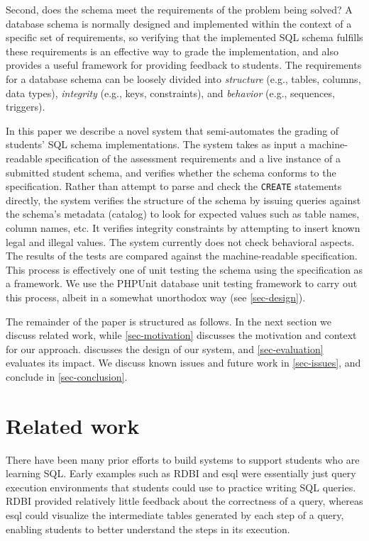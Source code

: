 \documentclass[sigconf, authordraft, capitalise]{acmart}
\begin{document}
Second, does the schema meet the requirements of the problem being solved? A database schema is normally designed and implemented within the context of a specific set of requirements, so verifying that the implemented SQL schema fulfills these requirements is an effective way to grade the implementation, and also provides a useful framework for providing feedback to students. The requirements for a database schema can be loosely divided into \emph{structure} (e.g., tables, columns, data types), \emph{integrity} (e.g., keys, constraints), and \emph{behavior} (e.g., sequences, triggers).

In this paper we describe a novel system that semi-automates the grading of students' SQL schema implementations. The system takes as input a machine-readable specification of the assessment requirements and a live instance of a submitted student schema, and verifies whether the schema conforms to the specification. Rather than attempt to parse and check the \texttt{CREATE} statements directly, the system verifies the structure of the schema by issuing queries against the schema's metadata (catalog) to look for expected values such as table names, column names, etc. It verifies integrity constraints by attempting to insert known legal and illegal values. The system currently does not check behavioral aspects. The results of the tests are compared against the machine-readable specification. This process is effectively one of unit testing the schema using the specification as a framework. We use the PHPUnit database unit testing framework to carry out this process, albeit in a somewhat unorthodox way (see \cref{sec-design}).

The remainder of the paper is structured as follows. In the next section we discuss related work, while \cref{sec-motivation} discusses the motivation and context for our approach.  discusses the design of our system, and \cref{sec-evaluation} evaluates its impact. We discuss known issues and future work in \cref{sec-issues}, and conclude in \cref{sec-conclusion}.


\section{Related work}
\label{sec-literature}

There have been many prior efforts to build systems to support students who are learning SQL. Early examples such as RDBI \cite{Dietrich.S-1993a-An-educational} and esql \cite{Kearns.R-1997a-A-teaching} were essentially just query execution environments that students could use to practice writing SQL queries. RDBI provided relatively little feedback about the correctness of a query, whereas esql could visualize the intermediate tables generated by each step of a query, enabling students to better understand the steps in its execution.
\end{document}
